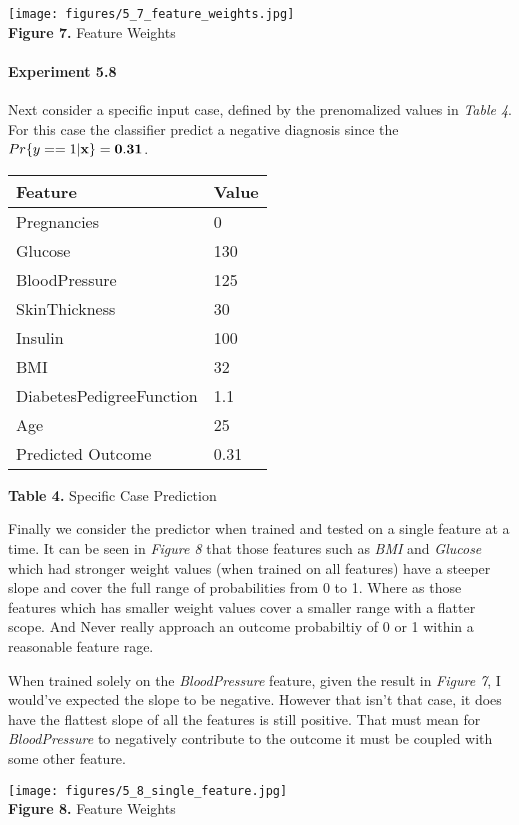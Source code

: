 \documentclass[11pt]{article}
\begin{document}
\texttt{[image: figures/5\_7\_feature\_weights.jpg]}\\
\textbf{Figure 7.} Feature Weights

    \hypertarget{experiment-5.8}{%
\paragraph{Experiment 5.8}\label{experiment-5.8}}

Next consider a specific input case, defined by the prenomalized values
in \emph{Table 4}. For this case the classifier predict a negative
diagnosis since the \(Pr\{y==1 | \bf{x}\} = 0.31\).

\begin{longtable}[]{@{}ll@{}}
\toprule
Feature & Value \\
\midrule
\endhead
Pregnancies & 0 \\
Glucose & 130 \\
BloodPressure & 125 \\
SkinThickness & 30 \\
Insulin & 100 \\
BMI & 32 \\
DiabetesPedigreeFunction & 1.1 \\
Age & 25 \\
Predicted Outcome & 0.31 \\
\bottomrule
\end{longtable}

\textbf{Table 4.} Specific Case Prediction

Finally we consider the predictor when trained and tested on a single
feature at a time. It can be seen in \emph{Figure 8} that those features
such as \emph{BMI} and \emph{Glucose} which had stronger weight values
(when trained on all features) have a steeper slope and cover the full
range of probabilities from 0 to 1. Where as those features which has
smaller weight values cover a smaller range with a flatter scope. And
Never really approach an outcome probabiltiy of 0 or 1 within a
reasonable feature rage.

When trained solely on the \emph{BloodPressure} feature, given the
result in \emph{Figure 7}, I would've expected the slope to be negative.
However that isn't that case, it does have the flattest slope of all the
features is still positive. That must mean for \emph{BloodPressure} to
negatively contribute to the outcome it must be coupled with some other
feature.

\texttt{[image: figures/5\_8\_single\_feature.jpg]}\\
\textbf{Figure 8.} Feature Weights
\end{document}
